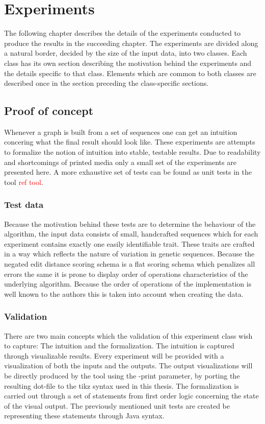 \documentclass[thesis.tex]{subfiles}
\begin{document}
\chapter{Experiments}
The following chapter describes the details of the experiments conducted to produce the results in the succeeding chapter. The experiments are divided along a natural border, decided by the size of the input data, into two classes. Each class has its own section describing the motivation behind the experiments and the details specific to that class. Elements which are common to both classes are described once in the section preceding the class-specific sections.
\section{Proof of concept}
Whenever a graph is built from a set of sequences one can get an intuition concering what the final result should look like. These experiments are attempts to formalize the notion of intuition into stable, testable results. Due to readability and shortcomings of printed media only a small set of the experiments are presented here. A more exhaustive set of tests can be found as unit tests in the tool \textcolor{red}{ref tool}.
\subsection{Test data}
Because the motivation behind these tests are to determine the behaviour of the algorithm, the input data consists of small, handcrafted sequences which for each experiment contains exactly one easily identifiable trait. These traits are crafted in a way which reflects the nature of variation in genetic sequences. Because the negated edit distance scoring schema is a flat scoring schema which penalizes all errors the same it is prone to display order of operations characteristics of the underlying algorithm. Because the order of operations of the implementation is well known to the authors this is taken into account when creating the data.
\subsection{Validation}
There are two main concepts which the validation of this experiment class wish to capture: The intuition and the formalization. The intuition is captured through visualizable results. Every experiment will be provided with a visualization of both the inputs and the outputs. The output visualizations will be directly produced by the tool using the -print parameter, by porting the resulting dot-file to the tikz syntax used in this thesis. The formalization is carried out through a set of statements from first order logic concerning the state of the visual output. The previously mentioned unit tests are created be representing these statements through Java syntax.
\end{document}
